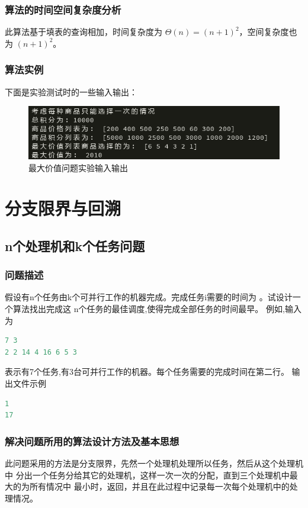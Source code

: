 \documentclass{ctexart}
\begin{document}
\subsubsection{算法的时间空间复杂度分析 }
此算法基于填表的查询相加，时间复杂度为 $\Theta(n) = (n+1)^2$，空间复杂度也为 $(n+1)^2$。
\subsubsection{算法实例}
下面是实验测试时的一些输入输出：
\begin{figure}[H]
	\centering
	\includegraphics[scale=0.6]{../images/xiaomei_max_value.png}
	\caption{最大价值问题实验输入输出}
\end{figure}


\newpage
\section{分支限界与回溯}
\subsection{n个处理机和k个任务问题}
\subsubsection{问题描述}
假设有n个任务由k个可并行工作的机器完成。完成任务i需要的时间为 。试设计一个算法找出完成这
n个任务的最佳调度,使得完成全部任务的时间最早。
例如,输入为
\begin{lstlisting}[language=C]
7 3
2 2 14 4 16 6 5 3
\end{lstlisting}
表示有7个任务,有3台可并行工作的机器。每个任务需要的完成时间在第二行。
输出文件示例
\begin{lstlisting}[language=C]
1
17
\end{lstlisting}
\subsubsection{解决问题所用的算法设计方法及基本思想}
此问题采用的方法是分支限界，先然一个处理机处理所以任务，然后从这个处理机中
分出一个任务分给其它的处理机，这样一次一次的分配，直到三个处理机中最大的为所有情况中
最小时，返回，并且在此过程中记录每一次每个处理机中的处理情况。
\end{document}
